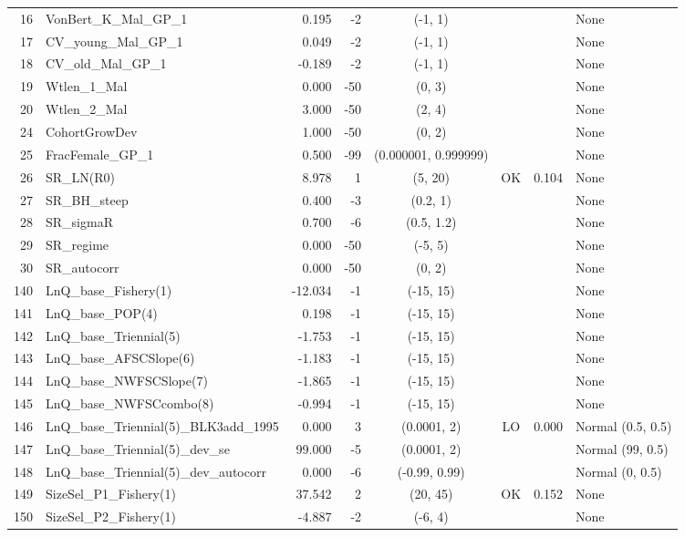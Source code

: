 \documentclass[12pt,]{article}
\begin{document}
\begin{landscape}
\begin{longtable}{rlrrcccl}
  16 & VonBert\_K\_Mal\_GP\_1 & 0.195 & -2 & (-1, 1) &  &  & None \\ 
  17 & CV\_young\_Mal\_GP\_1 & 0.049 & -2 & (-1, 1) &  &  & None \\ 
  18 & CV\_old\_Mal\_GP\_1 & -0.189 & -2 & (-1, 1) &  &  & None \\ 
  19 & Wtlen\_1\_Mal & 0.000 & -50 & (0, 3) &  &  & None \\ 
  20 & Wtlen\_2\_Mal & 3.000 & -50 & (2, 4) &  &  & None \\ 
  24 & CohortGrowDev & 1.000 & -50 & (0, 2) &  &  & None \\ 
  25 & FracFemale\_GP\_1 & 0.500 & -99 & (0.000001, 0.999999) &  &  & None \\ 
  26 & SR\_LN(R0) & 8.978 & 1 & (5, 20) & OK & 0.104 & None \\ 
  27 & SR\_BH\_steep & 0.400 & -3 & (0.2, 1) &  &  & None \\ 
  28 & SR\_sigmaR & 0.700 & -6 & (0.5, 1.2) &  &  & None \\ 
  29 & SR\_regime & 0.000 & -50 & (-5, 5) &  &  & None \\ 
  30 & SR\_autocorr & 0.000 & -50 & (0, 2) &  &  & None \\ 
  140 & LnQ\_base\_Fishery(1) & -12.034 & -1 & (-15, 15) &  &  & None \\ 
  141 & LnQ\_base\_POP(4) & 0.198 & -1 & (-15, 15) &  &  & None \\ 
  142 & LnQ\_base\_Triennial(5) & -1.753 & -1 & (-15, 15) &  &  & None \\ 
  143 & LnQ\_base\_AFSCSlope(6) & -1.183 & -1 & (-15, 15) &  &  & None \\ 
  144 & LnQ\_base\_NWFSCSlope(7) & -1.865 & -1 & (-15, 15) &  &  & None \\ 
  145 & LnQ\_base\_NWFSCcombo(8) & -0.994 & -1 & (-15, 15) &  &  & None \\ 
  146 & LnQ\_base\_Triennial(5)\_BLK3add\_1995 & 0.000 & 3 & (0.0001, 2) & LO & 0.000 & Normal (0.5, 0.5) \\ 
  147 & LnQ\_base\_Triennial(5)\_dev\_se & 99.000 & -5 & (0.0001, 2) &  &  & Normal (99, 0.5) \\ 
  148 & LnQ\_base\_Triennial(5)\_dev\_autocorr & 0.000 & -6 & (-0.99, 0.99) &  &  & Normal (0, 0.5) \\ 
  149 & SizeSel\_P1\_Fishery(1) & 37.542 & 2 & (20, 45) & OK & 0.152 & None \\ 
  150 & SizeSel\_P2\_Fishery(1) & -4.887 & -2 & (-6, 4) &  &  & None \\ 

\end{longtable}
\end{landscape}
\end{document}
